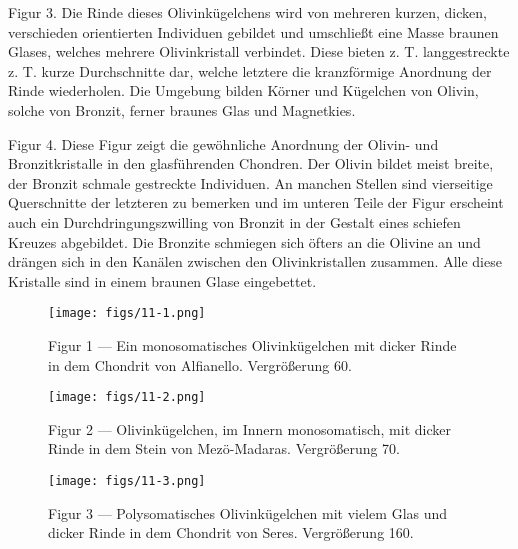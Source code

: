 \documentclass[a4paper, 11pt, oneside, polutonikogreek, german]{article}
\begin{document}
Figur 3. Die Rinde dieses Olivinkügelchens wird von mehreren kurzen, dicken, verschieden orientierten Individuen gebildet und umschließt eine Masse braunen Glases, welches mehrere Olivinkristall verbindet. Diese bieten z. T. langgestreckte z. T. kurze Durchschnitte dar, welche letztere die kranzförmige Anordnung der Rinde wiederholen. Die Umgebung bilden Körner und Kügelchen von Olivin, solche von Bronzit, ferner braunes Glas und Magnetkies.

Figur 4. Diese Figur zeigt die gewöhnliche Anordnung der Olivin- und Bronzitkristalle in den glasführenden Chondren. Der Olivin bildet meist breite, der Bronzit schmale gestreckte Individuen. An manchen Stellen sind vierseitige Querschnitte der letzteren zu bemerken und im unteren Teile der Figur erscheint auch ein Durchdringungszwilling von Bronzit in der Gestalt eines schiefen Kreuzes abgebildet. Die Bronzite schmiegen sich öfters an die Olivine an und drängen sich in den Kanälen zwischen den Olivinkristallen zusammen. Alle diese Kristalle sind in einem braunen Glase eingebettet.
\clearpage

\vspace*{\fill}
\begin{figure}[H]
\centering
\texttt{[image: figs/11-1.png]}
\caption{\small Figur 1 --- Ein monosomatisches Olivinkügelchen mit dicker Rinde in dem Chondrit von Alfianello. Vergrößerung 60.}
\end{figure}
\vspace*{\fill}
\clearpage

\vspace*{\fill}
\begin{figure}[H]
\centering
\texttt{[image: figs/11-2.png]}
\caption{\small Figur 2 --- Olivinkügelchen, im Innern monosomatisch, mit dicker Rinde in dem Stein von Mezö-Madaras. Vergrößerung 70.}
\end{figure}
\vspace*{\fill}
\clearpage

\vspace*{\fill}
\begin{figure}[H]
\centering
\texttt{[image: figs/11-3.png]}
\caption{\small Figur 3 --- Polysomatisches Olivinkügelchen mit vielem Glas und dicker Rinde in dem Chondrit von Seres. Vergrößerung 160.}
\end{figure}
\vspace*{\fill}
\clearpage
\end{document}
